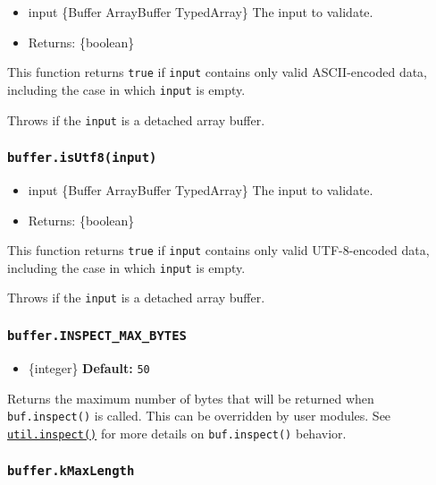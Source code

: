 \begin{itemize}
\tightlist
\item
  input \{Buffer \textbar{} ArrayBuffer \textbar{} TypedArray\} The
  input to validate.
\item
  Returns: \{boolean\}
\end{itemize}

This function returns \texttt{true} if \texttt{input} contains only
valid ASCII-encoded data, including the case in which \texttt{input} is
empty.

Throws if the \texttt{input} is a detached array buffer.

\subsubsection{\texorpdfstring{\texttt{buffer.isUtf8(input)}}{buffer.isUtf8(input)}}\label{buffer.isutf8input}

\begin{itemize}
\tightlist
\item
  input \{Buffer \textbar{} ArrayBuffer \textbar{} TypedArray\} The
  input to validate.
\item
  Returns: \{boolean\}
\end{itemize}

This function returns \texttt{true} if \texttt{input} contains only
valid UTF-8-encoded data, including the case in which \texttt{input} is
empty.

Throws if the \texttt{input} is a detached array buffer.

\subsubsection{\texorpdfstring{\texttt{buffer.INSPECT\_MAX\_BYTES}}{buffer.INSPECT\_MAX\_BYTES}}\label{buffer.inspect_max_bytes}

\begin{itemize}
\tightlist
\item
  \{integer\} \textbf{Default:} \texttt{50}
\end{itemize}

Returns the maximum number of bytes that will be returned when
\texttt{buf.inspect()} is called. This can be overridden by user
modules. See
\href{util.md\#utilinspectobject-options}{\texttt{util.inspect()}} for
more details on \texttt{buf.inspect()} behavior.

\subsubsection{\texorpdfstring{\texttt{buffer.kMaxLength}}{buffer.kMaxLength}}\label{buffer.kmaxlength}

